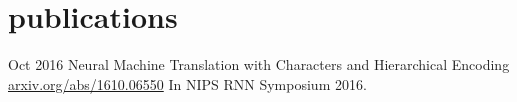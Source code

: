 \documentclass[]{friggeri-cv}
\begin{document}
\section{publications}

\begin{entrylist}
  \entry
    {Oct 2016}
    {Neural Machine Translation with Characters and Hierarchical Encoding\\}
    {\href{https://arxiv.org/abs/1610.06550}{arxiv.org/abs/1610.06550}}
    {In NIPS RNN Symposium 2016.}
\end{entrylist}


\end{document}
